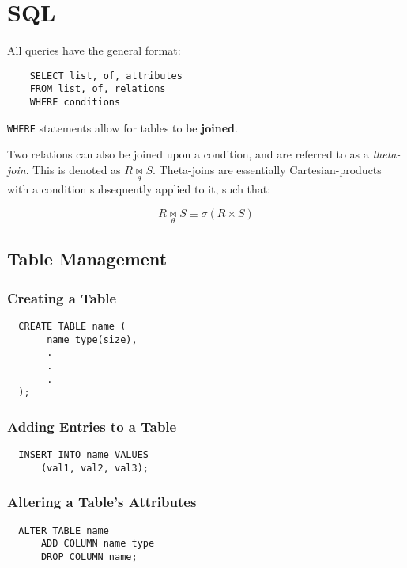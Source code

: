 \documentclass{article}
\begin{document}
\section{SQL}

All queries have the general format:

\begin{lstlisting}
    SELECT list, of, attributes
    FROM list, of, relations
    WHERE conditions
\end{lstlisting}

\texttt{WHERE} statements allow for tables to be \textbf{joined}.

Two relations can also be joined upon a condition, and are referred to as a \textit{theta-join}. This is denoted as $R \underset{\theta}{\Join} S$. Theta-joins are essentially Cartesian-products with a condition subsequently applied to it, such that:

\[ R \underset{\theta}{\Join} S \equiv \sigma(R \times S) \]

\subsection{Table Management}

\subsubsection{Creating a Table}

\begin{lstlisting}
  CREATE TABLE name (
       name type(size),
       .
       .
       .
  );
\end{lstlisting}

\subsubsection{Adding Entries to a Table}

\begin{lstlisting}
  INSERT INTO name VALUES
      (val1, val2, val3);
\end{lstlisting}

\subsubsection{Altering a Table's Attributes}

\begin{lstlisting}
  ALTER TABLE name
      ADD COLUMN name type
      DROP COLUMN name;
\end{lstlisting}
\end{document}
